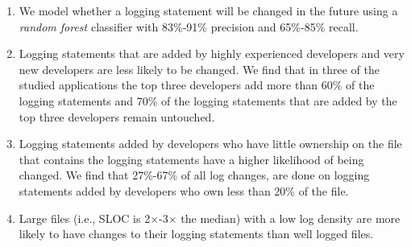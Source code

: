 \begin{enumerate}
	\item We model whether a logging statement will be changed in the future using a \emph{random forest} classifier with 83\%-91\% precision and 65\%-85\% recall. 


	\item Logging statements that are added by highly experienced developers and very new developers are less likely to be changed. We find that in three of the studied applications the top three developers add more than 60\% of the logging statements and 70\% of the logging statements that are added by the top three developers remain untouched. 
	
	\item Logging statements added by developers who have little ownership on the file that contains the logging statements have a higher likelihood of being changed. We find that 27\%-67\% of all log changes, are done on logging statements added by developers who own less than 20\% of the file.
 
	
	
	
	\item Large files (i.e., SLOC is 2$\times$-3$\times$ the median) with a low log density are more likely to have changes to their logging statements than well logged files.


\end{enumerate}

